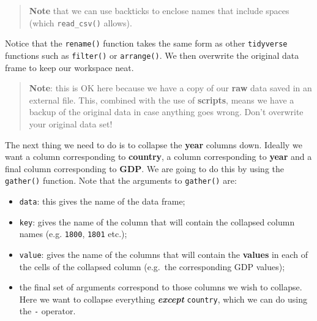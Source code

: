 \documentclass[]{book}
\newenvironment{Shaded}{\begin{snugshade}}{\end{snugshade}}
\newcommand{\KeywordTok}[1]{\textcolor[rgb]{0.13,0.29,0.53}{\textbf{{#1}}}}
\newcommand{\DataTypeTok}[1]{\textcolor[rgb]{0.13,0.29,0.53}{{#1}}}
\newcommand{\StringTok}[1]{\textcolor[rgb]{0.31,0.60,0.02}{{#1}}}
\newcommand{\NormalTok}[1]{{#1}}
\providecommand{\tightlist}{%
  \setlength{\itemsep}{0pt}\setlength{\parskip}{0pt}}
\theoremstyle{definition}
\theoremstyle{definition}
\theoremstyle{definition}
\theoremstyle{remark}
\begin{document}
\begin{quote}
\textbf{Note} that we can use backticks to enclose names that include
spaces (which \texttt{read\_csv()} allows).
\end{quote}

Notice that the \texttt{rename()} function takes the same form as other
\texttt{tidyverse} functions such as \texttt{filter()} or
\texttt{arrange()}. We then overwrite the original data frame to keep
our workspace neat.

\begin{quote}
\textbf{Note}: this is OK here because we have a copy of our
\textbf{raw} data saved in an external file. This, combined with the use
of \textbf{scripts}, means we have a backup of the original data in case
anything goes wrong. Don't overwrite your original data set!
\end{quote}

The next thing we need to do is to collapse the \textbf{year} columns
down. Ideally we want a column corresponding to \textbf{country}, a
column corresponding to \textbf{year} and a final column corresponding
to \textbf{GDP}. We are going to do this by using the \texttt{gather()}
function. Note that the arguments to \texttt{gather()} are:

\begin{itemize}
\tightlist
\item
  \texttt{data}: this gives the name of the data frame;
\item
  \texttt{key}: gives the name of the column that will contain the
  collapsed column names (e.g. \texttt{1800}, \texttt{1801} etc.);
\item
  \texttt{value}: gives the name of the columns that will contain the
  \textbf{values} in each of the cells of the collapsed column (e.g.~the
  corresponding GDP values);
\item
  the final set of arguments correspond to those columns we wish to
  collapse. Here we want to collapse everything \textbf{\emph{except}}
  \texttt{country}, which we can do using the \texttt{-} operator.
\end{itemize}

\begin{Shaded}
\end{Shaded}
\end{document}

